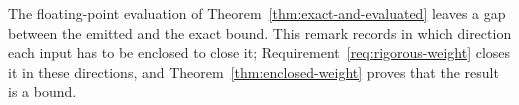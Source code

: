 
The floating-point evaluation of Theorem~\ref{thm:exact-and-evaluated} leaves a gap between
the emitted and the exact bound. This remark records in which direction each
input has to be enclosed to close it; Requirement~\ref{req:rigorous-weight}
closes it in these directions, and Theorem~\ref{thm:enclosed-weight} proves
that the result is a bound.

